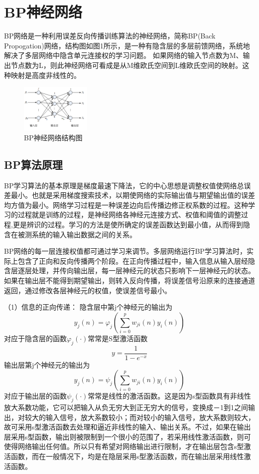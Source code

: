 \documentclass[UTF8]{ctexart}
\begin{document}
\section{BP神经网络}
BP网络是一种利用误差反向传播训练算法的神经网络，简称BP(Back Propogation)网络，结构图如图1所示，是一种有隐含层的多层前馈网络，系统地解决了多层网络中隐含单元连接权的学习问题。 如果网络的输入节点数为M、输出节点数为L，则此神经网络可看成是从M维欧氏空间到L维欧氏空间的映射。这种映射是高度非线性的。
\begin{figure}[htbp]
	\centering
	\includegraphics [width=0.3\textwidth]{fig/png1.png}
	\caption{BP神经网络结构图}
	\label{fig:my_png_1}
\end{figure}
\subsection{BP算法原理}
 BP学习算法的基本原理是梯度最速下降法，它的中心思想是调整权值使网络总误差最小。也就是采用梯度搜索技术，以期使网络的实际输出值与期望输出值的误差均方值为最小。网络学习过程是一种误差边向后传播边修正权系数的过程。这种学习的过程就是训练的过程，是神经网络各神经元连接方式、权值和阈值的调整过程,更是辨识的过程。学习的方法是使所确定的误差函数达到最小值，从而得到隐含在被测系统的输入输出数据之间的关系。

BP网络的每一层连接权值都可通过学习来调节。多层网络运行BP学习算法时，实际上包含了正向和反向传播两个阶段。在正向传播过程中，输入信息从输入层经隐含层逐层处理，并传向输出层，每一层神经元的状态只影响下一层神经元的状态。如果在输出层不能得到期望输出，则转入反向传播，将误差信号沿原来的连接通道返回，通过修改各层神经元的权值，使误差信号最小。

（1）信息的正向传递：
隐含层中第j个神经元的输出为
$$ y_{j}(n)=\varphi_j(\sum^{p}_{i=0}w_{ji}(n)y_i(n)) $$
对应于隐含层的函数$ \varphi_j(\cdot) $常常是S型激活函数
$$ y=\frac{1}{1-e^{-x}} $$
输出层第j个神经元的输出为
$$ y_j(n)=\psi_j(\sum^{p}_{i=0}w_{ji}(n)y_i(n)) $$
对应于输出层的函数$ \psi_j(\cdot) $常常是线性的激活函数。这是因为s型函数具有非线性放大系数功能，它可以把输入从负无穷大到正无穷大的信号，变换成－1到1之间输出，对较大的输入信号，放大系数较小；而对较小的输入信号，放大系数则较大，故可采用s型激活函数去处理和逼近非线性的输入、输出关系。不过，如果在输出层采用s型函数，输出则被限制到一个很小的范围了，若采用线性激活函数，则可使得网络输出任何值。所以只有希望对网络输出进行限制，才在输出层包含s型激活函数，而在一般情况下，均是在隐层采用s型激活函数，而在输出层采用线性激活函数。
\end{document}
